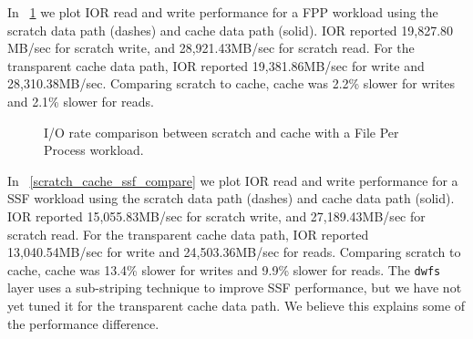 \documentclass[10pt, conference, compsocconf]{IEEEtran}
\begin{document}
In \figurename~\ref{scratch_cache_fpp_compare} we plot IOR read and write performance for a FPP workload using the scratch data path (dashes) and cache data path (solid).  IOR reported 19,827.80 MB/sec for scratch write, and 28,921.43MB/sec for scratch read.  For the transparent cache data path, IOR reported 19,381.86MB/sec for write and 28,310.38MB/sec.  Comparing scratch to cache, cache was 2.2\% slower for writes and 2.1\% slower for reads.

\begin{figure}
\centering
{}
\caption{I/O rate comparison between scratch and cache with a File Per Process workload.\label{scratch_cache_fpp_compare}}
\end{figure}

In \figurename~\ref{scratch_cache_ssf_compare} we plot IOR read and write performance for a SSF workload using the scratch data path (dashes) and cache data path (solid).  IOR reported 15,055.83MB/sec for scratch write, and 27,189.43MB/sec for scratch read.  For the transparent cache data path, IOR reported 13,040.54MB/sec for write and 24,503.36MB/sec for reads.  Comparing scratch to cache, cache was 13.4\% slower for writes and 9.9\% slower for reads.  The \texttt{dwfs} layer uses a sub-striping technique to improve SSF performance, but we have not yet tuned it for the transparent cache data path.  We believe this explains some of the performance difference.
\end{document}
